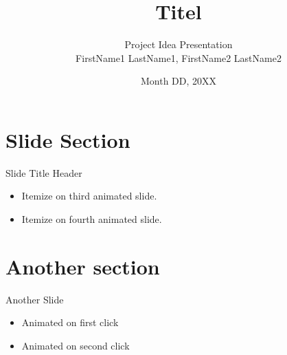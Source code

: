 \documentclass[aspectratio=169,xcolor=table]{beamer}
\title              {Titel}
\author             {Project Idea Presentation\\ FirstName1 LastName1, FirstName2 LastName2}
\institute          {Operating Systems Lecture Spring Semester 20XX}
\date               {Month DD, 20XX}
\begin{document}
\renewcommand{\arraystretch}{1.5}

\begin{frame}[t,plain]
\titlepage
\end{frame}




\section{Slide Section}

\begin{frame}[c]{Slide Title}
    Header \\
    \vspace{10pt}
    \vspace{10pt}
    \begin{itemize}
        \item<3-> Itemize on third animated slide.
        \item<4-> Itemize on fourth animated slide.
    \end{itemize}   
\end{frame}

\section{Another section}

\begin{frame}[c]{Another Slide}
    \begin{itemize}
        \item<+> Animated on first click
        \item<+> Animated on second click
    \end{itemize}   
\end{frame}
\end{document}
